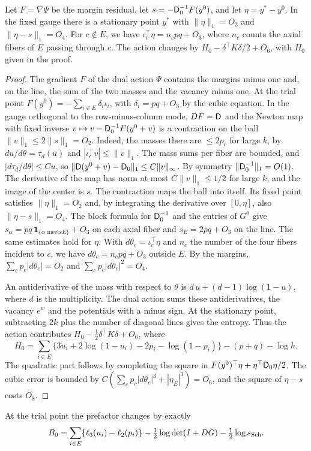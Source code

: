 \begin{lema}\label{lem:linea-desplazamiento}
Let $F=\nabla\Psi$ be the margin residual, let $s=-\mathsf D_0^{-1}F(y^0)$, and let $\eta=y^*-y^0$.
In the fixed gauge there is a stationary point $y^*$ with $\|\eta\|_1=O_2$ and $\|\eta-s\|_1=O_4$.
For $c\notin E$, we have $\iota_c^\top\eta=n_cpq+O_3$, where $n_c$ counts the axial fibers of $E$
passing through $c$. The action changes by $H_0-\delta^\top K\delta/2+O_6$, with $H_0$ given in
the proof.
\end{lema}
\begin{proof}
The gradient $F$ of the dual action $\Psi$ contains the margins minus one and, on the line, the
sum of the two masses and the vacancy minus one. At the trial point $F(y^0)=-\sum_{i\in
E}\delta_i\iota_i$, with $\delta_i=pq+O_3$ by the cubic equation. In the gauge orthogonal to the
row-minus-column mode, $DF=\mathsf D$ and the Newton map with fixed inverse $v\mapsto
v-\mathsf D_0^{-1}F(y^0+v)$ is a contraction on the ball $\|v\|_1\le 2\|s\|_1=O_2$. Indeed, the
masses there are $\le 2p_c$ for large $k$, by $du/d\theta=\tau_d(u)$ and $|\iota_c^\top
v|\le\|v\|_1$. The mass sums per fiber are bounded, and $|d\tau_d/d\theta|\le C u$, so
$\|\mathsf D(y^0+v)-\mathsf D_0\|_1\le C\|v\|_\infty$. By symmetry $\|\mathsf D_0^{-1}\|_1=O(1)$. The
derivative of the map has norm at most $C\|v\|_1\le1/2$ for large $k$, and the image of the center
is $s$. The contraction maps the ball into itself. Its fixed point satisfies $\|\eta\|_1=O_2$ and,
by integrating the derivative over $[0,\eta]$, also $\|\eta-s\|_1=O_4$. The block formula for
$\mathsf D_0^{-1}$ and the entries of $G^0$ give $s_\alpha=pq\,\symbf{1}_{\{\alpha\text{ meets
}E\}}+O_3$ on each axial fiber and $s_E=2pq+O_3$ on the line. The same estimates hold for $\eta$.
With $d\theta_c=\iota_c^\top\eta$ and $n_c$ the number of the four fibers incident to $c$, we have
$d\theta_c=n_cpq+O_3$ outside $E$. By the margins, $\sum_c p_c|d\theta_c|=O_2$ and $\sum_c
p_c|d\theta_c|^2=O_4$.

An antiderivative of the mass with respect to $\theta$ is $d\,u+(d-1)\log(1-u)$, where $d$ is the
multiplicity. The dual action sums these antiderivatives, the vacancy $e^{w}$ and the potentials
with a minus sign. At the stationary point, subtracting $2k$ plus the number of diagonal lines
gives the entropy. Thus the action contributes $H_0-\tfrac12\delta^\top K\delta+O_6$, where
\[
 H_0=\sum_{i\in E}\{3u_i+2\log(1-u_i)-2p_i-\log(1-p_i)\}-(p+q)-\log h .
\]
The quadratic part follows by completing the square in $F(y^0)^\top\eta+\eta^\top
\mathsf D_0\eta/2$. The cubic error is bounded by $C(\sum_c p_c|d\theta_c|^3+|\eta_E|^3)=O_6$, and
the square of $\eta-s$ costs $O_8$.
\end{proof}
At the trial point the prefactor changes by exactly
\[
 B_0=\sum_{i\in E}\{\ell_3(u_i)-\ell_2(p_i)\}
       -\tfrac12\log\det(I+DG)-\tfrac12\log s_{\mathrm{Sch}} .
\]

